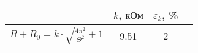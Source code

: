 \begin{tabular}{l|ccc}
	\toprule
	 & $k$, $\text{кОм}$ & $\varepsilon_k$, \% \\ \midrule
	$R+R_0=k \cdot \sqrt{\frac{4\pi^2}{\Theta^2} + 1}$ & 9.51 & 2 \\
\bottomrule
\end{tabular}
